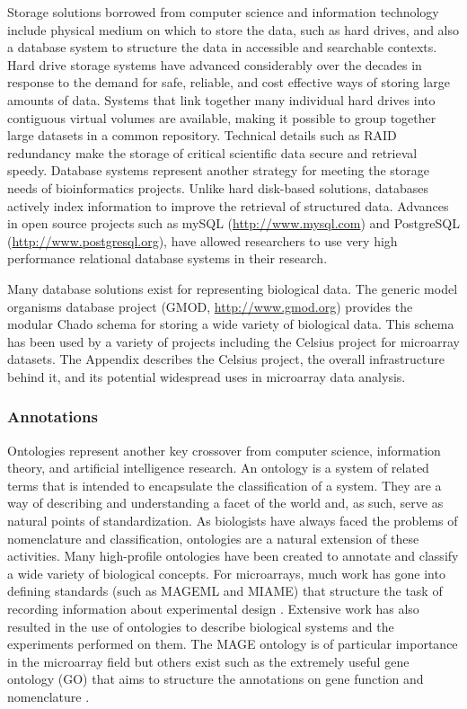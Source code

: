 Storage solutions borrowed from computer science and information technology
include physical medium on which to store the data, such as hard drives, and also a
database system to structure the data in accessible and searchable contexts.
Hard drive storage systems have advanced considerably over the decades in
response to the demand for safe, reliable, and cost effective ways of storing
large amounts of data.  Systems that link together many individual hard drives
into contiguous virtual volumes are available, making it possible to group
together large datasets in a common repository.  Technical details such as RAID
redundancy make the storage of critical scientific data secure and retrieval
speedy.  Database systems represent another strategy for meeting the storage
needs of bioinformatics projects.  Unlike hard disk-based solutions, databases
actively index information to improve the retrieval of structured data.
Advances in open source projects such as mySQL (\url{http://www.mysql.com}) and
PostgreSQL (\url{http://www.postgresql.org}), have allowed researchers to use
very high performance relational database systems in their research.

Many database solutions exist for representing biological data.  The generic
model organisms database project (GMOD, \url{http://www.gmod.org}) provides the
modular Chado schema for storing a wide variety of biological data.  This
schema has been used by a variety of projects including the Celsius project for
microarray datasets.  The Appendix describes the Celsius project,
the overall infrastructure behind it, and its potential widespread uses in
microarray data analysis.

\subsubsection{Annotations}

Ontologies represent another key crossover from computer science, information
theory, and artificial intelligence research.  An ontology is a system of
related terms that is intended to encapsulate the classification of a system.
They are a way of describing and understanding a facet of the world and, as such,
serve as natural points of standardization.  As biologists have always faced
the problems of nomenclature and classification, ontologies are a natural
extension of these activities.  Many high-profile ontologies have been created
to annotate and classify a wide variety of biological concepts.  For
microarrays, much work has gone into defining standards (such as MAGEML and
MIAME) that structure the task of recording information about experimental
design \cite{brazma2001mim}. Extensive work has also resulted in the use of
ontologies to describe biological systems and the experiments performed on
them.  The MAGE ontology is of particular importance in the microarray field
but others exist such as the extremely useful gene ontology (GO) that aims to
structure the annotations on gene function and nomenclature
\cite{stoeckert2003mof,ashburner2000got}.


